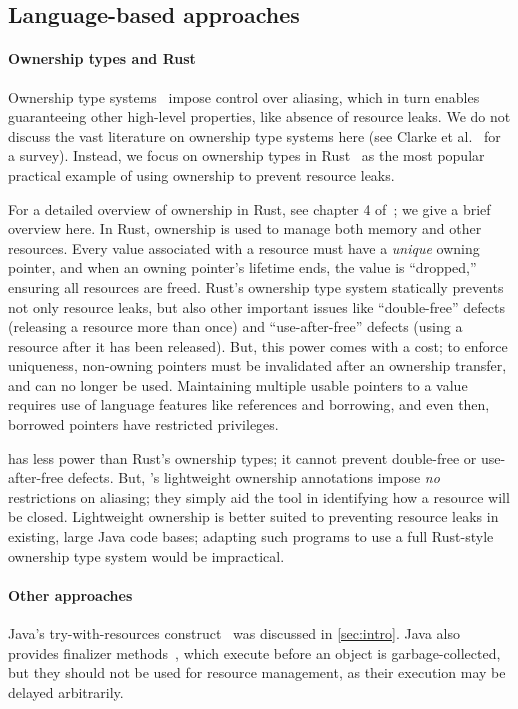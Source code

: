 \subsection{Language-based approaches}\label{sec:rw-language}

\paragraph{Ownership types and Rust} Ownership type
systems~\cite{clarke2013ownership} impose control over aliasing, which
in turn enables guaranteeing other high-level properties, like absence of
resource leaks.  We do not discuss the vast literature on ownership type systems
here (see Clarke et al.~\cite{clarke2013ownership} for a survey). Instead, we
focus on ownership types in Rust~\cite{klabnik2018rust} as the most popular
practical example of using ownership to prevent resource leaks.

For a detailed overview of ownership in Rust, see chapter 4
of~\cite{klabnik2018rust}; we give a brief overview here.  In Rust, ownership is
used to manage both memory and other resources.  Every value associated with a
resource must have a \emph{unique} owning pointer, and when an owning pointer's
lifetime ends, the value is ``dropped,'' ensuring all resources are freed.
Rust's ownership type system statically prevents
not only resource leaks, but also other important issues like ``double-free'' defects
(releasing a resource more than once) and ``use-after-free'' defects (using a
resource after it has been released). But, this power comes with a cost; to
enforce uniqueness, non-owning pointers must be invalidated after an ownership transfer,
and can no longer be used.  Maintaining multiple
usable pointers to a value requires use of language features like references and
borrowing, and even then, borrowed pointers have restricted privileges.

\Tool has less power than Rust's ownership types; it cannot prevent double-free
or use-after-free defects.  But,
\tool's lightweight ownership annotations impose \emph{no} restrictions on
aliasing; they simply aid the tool in identifying how a resource will
be closed.  Lightweight ownership is better suited to preventing
resource leaks in existing, large Java code bases; adapting such programs to use
a full Rust-style ownership type system would be impractical.

\paragraph{Other approaches} Java's try-with-resources
construct~\cite{try-with-resources} was discussed in \cref{sec:intro}.  Java
also provides finalizer methods~\cite[Chapter 12]{gosling2014jls}, which execute before an object is
garbage-collected, but they should not be used for resource management, as their
execution may be delayed arbitrarily.

